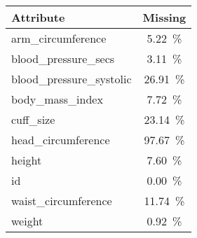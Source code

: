 \begin{tabular}{lS[table-format=2.2]}
\toprule
\textbf{Attribute} &  \textbf{Missing} \\
\midrule
arm\_circumference &       5.22\ \% \\
blood\_pressure\_secs &       3.11\ \% \\
blood\_pressure\_systolic &      26.91\ \% \\
body\_mass\_index &       7.72\ \% \\
cuff\_size &      23.14\ \% \\
head\_circumference &      97.67\ \% \\
height &       7.60\ \% \\
id &       0.00\ \% \\
waist\_circumference &      11.74\ \% \\
weight &       0.92\ \% \\
\bottomrule
\end{tabular}

